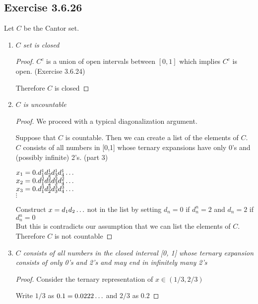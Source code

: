 \documentclass[12pt, a4paper]{article}
\begin{document}
     \subsection*{Exercise 3.6.26}
        Let $C$ be the Cantor set.
        \begin{enumerate}
            \item \textit{$C$ set is closed}
                \begin{proof}
                    $C^c$ is a union of open intervals between $[0,1]$ which implies $C^c$ is open. (Exercise 3.6.24)

                    Therefore $C$ is closed
                \end{proof}
            \item \textit{$C$ is uncountable}
                \begin{proof}
                    We proceed with a typical diagonalization argument.

                    Suppose that $C$ is countable. Then we can create a list of the elements of $C$.\\ 
                    $C$ consists of all numbers in [0,1] whose ternary expansions have only 0's and\\ (possibly infinite) 2's. (part 3)

                    $x_1 = 0.d_1^1d_2^1d_3^1d_4^1\mathellipsis$\\
                    $x_2 = 0.d_1^2d_2^2d_3^2d_4^2\mathellipsis$\\
                    $x_3 = 0.d_1^3d_2^3d_3^3d_4^3\mathellipsis$\\
                    $\vdots$

                    Construct $x=d_1d_2\mathellipsis$ not in the list by setting $d_n= 0$ if $d_n^n = 2$ and $d_n = 2$ if $d_n^n = 0$\\
                    But this is contradicts our assumption that we can list the elements of $C$. \\
                    Therefore $C$ is not countable
                \end{proof}
            \item \textit{$C$ consists of all numbers in the closed interval [0, 1]
            whose ternary expansion consists of only 0's and 2's and may end
            in infinitely many 2's}
                \begin{proof}
                    Consider the ternary representation of $x\in (1/3,2/3)$

                    Write $1/3$ as $0.1=0.0222\mathellipsis$ and  $2/3$  as $0.2$


\end{proof}
\end{enumerate}
\end{document}

